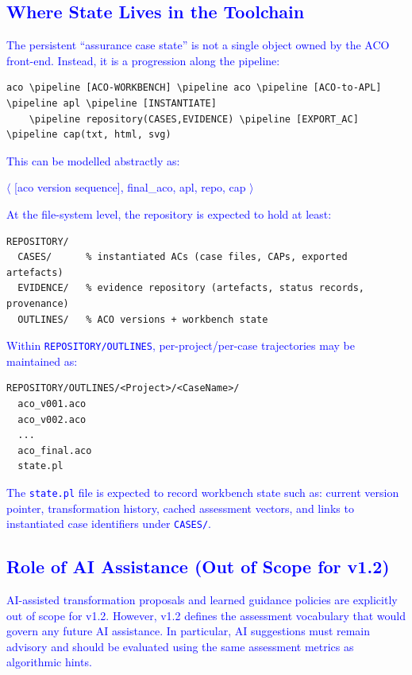 \documentclass[11pt]{article}
\newcommand{\pipeline}{\textrightarrow}
\begin{document}
\subsection{\textcolor{blue}{Where State Lives in the Toolchain}}

\textcolor{blue}{The persistent ``assurance case state'' is not a single object owned by the ACO front-end. Instead, it is a progression along the pipeline:}

\begin{verbatim}
aco \pipeline [ACO-WORKBENCH] \pipeline aco \pipeline [ACO-to-APL] \pipeline apl \pipeline [INSTANTIATE]
    \pipeline repository(CASES,EVIDENCE) \pipeline [EXPORT_AC] \pipeline cap(txt, html, svg)
\end{verbatim}

\textcolor{blue}{This can be modelled abstractly as:}
\begin{center}
\textcolor{blue}{$\langle$ [aco version sequence], final\_aco, apl, repo, cap $\rangle$}
\end{center}

\textcolor{blue}{At the file-system level, the repository is expected to hold at least:}
\begin{verbatim}
REPOSITORY/
  CASES/      % instantiated ACs (case files, CAPs, exported artefacts)
  EVIDENCE/   % evidence repository (artefacts, status records, provenance)
  OUTLINES/   % ACO versions + workbench state
\end{verbatim}

\textcolor{blue}{Within \texttt{REPOSITORY/OUTLINES}, per-project/per-case trajectories may be maintained as:}
\begin{verbatim}
REPOSITORY/OUTLINES/<Project>/<CaseName>/
  aco_v001.aco
  aco_v002.aco
  ...
  aco_final.aco
  state.pl
\end{verbatim}

\textcolor{blue}{The \texttt{state.pl} file is expected to record workbench state such as: current version pointer, transformation history, cached assessment vectors, and links to instantiated case identifiers under \texttt{CASES/}.}

\subsection{\textcolor{blue}{Role of AI Assistance (Out of Scope for v1.2)}}

\textcolor{blue}{AI-assisted transformation proposals and learned guidance policies are explicitly out of scope for v1.2. However, v1.2 defines the assessment vocabulary that would govern any future AI assistance. In particular, AI suggestions must remain advisory and should be evaluated using the same assessment metrics as algorithmic hints.}
\end{document}

